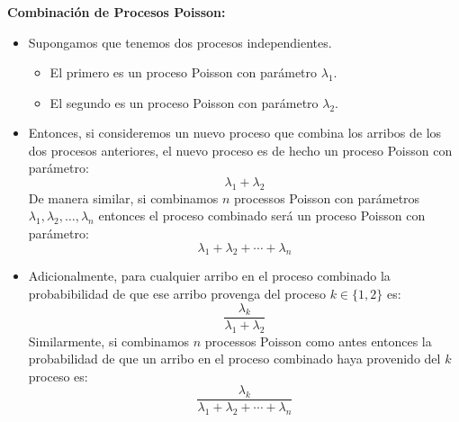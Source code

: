 \documentclass[ 10pt, xcolor = dvipsnames]{beamer}
\begin{document}
\begin{frame}[allowframebreaks]
\frametitle{\insertsection}

\textbf{Combinaci\'on de Procesos Poisson:}
\begin{itemize}
\item Supongamos que tenemos dos procesos independientes. 
\begin{itemize}
\item El primero es un proceso Poisson con par\'ametro $\lambda_1$.
\item El segundo es un proceso Poisson con par\'ametro $\lambda_2$.
\end{itemize}
\item Entonces, si consideremos un nuevo proceso que combina los arribos de \linebreak los dos procesos anteriores, el nuevo proceso es de hecho un \linebreak proceso Poisson con par\'ametro:
\[
\lambda_1 + \lambda_2
\]
De manera similar, si combinamos $n$ processos Poisson con par\'ametros $\lambda_1, \lambda_2, \dots, \lambda_n$ entonces el proceso combinado ser\'a un proceso Poisson \linebreak con par\'ametro: 
\[
\lambda_1 + \lambda_2 + \cdots + \lambda_n
\]
\item Adicionalmente, para cualquier arribo en el proceso combinado la probabibilidad de que ese arribo provenga del proceso $k \in \{ 1, 2 \}$ es: 
\[
\frac{\lambda_k}{ \lambda_1 + \lambda_2 }
\]
Similarmente, si combinamos $n$ processos Poisson como antes entonces la probabilidad de que un arribo en el proceso combinado haya provenido del $k$ proceso es: 
\[
\frac{\lambda_k}{ \lambda_1 + \lambda_2 + \cdots + \lambda_n }
\]
\end{itemize}

\end{frame}
\end{document}
